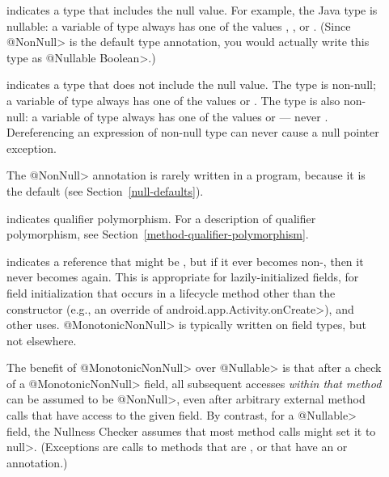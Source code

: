 \begin{description}

\item[]
  indicates a type that includes the null value.  For example, the Java
  type 
  is nullable:  a variable of type  always has one of the
  values , , or .
  (Since \<@NonNull> is the default type annotation, you would actually
  write this type as \<@Nullable Boolean>.)

\item[]
  indicates a type that does not include the null value.  The type
   is non-null; a variable of type  always has
  one of the values  or .  The type  is also non-null:  a variable of type 
  always has one of the values  or  --- never
  .  Dereferencing an expression of non-null type can never cause
  a null pointer exception.

  The \<@NonNull> annotation is rarely written in a program, because it is
  the default (see Section~\ref{null-defaults}).

\item[]
  indicates qualifier polymorphism.
  For a description of qualifier polymorphism, see
  Section~\ref{method-qualifier-polymorphism}.

\item[]
  indicates a reference that might be , but if it ever becomes
  non-, then it never becomes  again.  This is
  appropriate for lazily-initialized fields, for field initialization that
  occurs in a lifecycle method other than the constructor (e.g., an
  override of \<android.app.Activity.onCreate>), and other uses.
  \<@MonotonicNonNull> is typically written on field types, but not elsewhere.

  \begin{sloppypar}
  The benefit of \<@MonotonicNonNull> over \<@Nullable> is that after a
  check of a \<@MonotonicNonNull> field, all subsequent accesses
  \emph{within that method} can be assumed to be \<@NonNull>, even after
  arbitrary external method calls that have access to the given field.
  By contrast, for a \<@Nullable> field, the Nullness Checker assumes that
  most method calls might set it to \<null>. (Exceptions are calls to
  methods that are , or that
  have an  or
   annotation.)
  \end{sloppypar}


\end{description}
